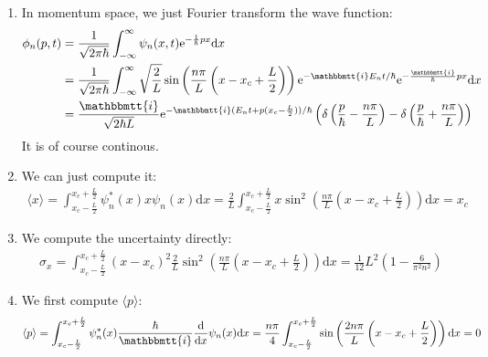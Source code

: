 \documentclass[]{ctexart}
\newcommand{\mi}{\mathbbmtt{i}}
\newcommand{\di}{\mathrm{d}}
\newcommand{\me}{\mathrm{e}}
\begin{document}
\begin{enumerate}
				\item In momentum space, we just Fourier transform the wave function:
					\begin{equation*}
						\begin{aligned}
							\phi_{n}(p, t)&=\frac{1}{\sqrt{2 \pi \hbar}} \int_{-\infty}^{\infty} \psi_{n}(x, t) \me^{-\frac{1}{\hbar} p x} \di x  \\
							&=\frac{1}{\sqrt{2 \pi \hbar}} \int_{-\infty}^{\infty} \sqrt{\frac{2}{L}}\sin\left( \frac{n\pi}{L}\left( x-x_c+\frac{L}{2}\right)\right)\me^{-\mi E_n t/\hbar} \me^{-\frac{\mi}{\hbar} p x} \di x\\
							&=\frac{\mi}{\sqrt{2 \hbar L}}\me^{-\mi (E_n t+p(x_c-\frac{L}{2}))/\hbar}  \left(\delta\left( \frac{p}{\hbar}-\frac{n\pi}{L}\right) -\delta\left( \frac{p}{\hbar}+\frac{n\pi}{L}\right) \right) 
						\end{aligned}
					\end{equation*}
				It is of course continous. 
				
				\item We can just compute it:
					\begin{equation*}
						\begin{aligned}
							\langle x\rangle=\int_{x_c-\frac{L}{2}}^{x_c+\frac{L}{2}}\psi_n^*(x)x\psi_n(x) \di x=\frac{2}{L}\int_{x_c-\frac{L}{2}}^{x_c+\frac{L}{2}}x\sin^2\left( \frac{n\pi}{L}\left( x-x_c+\frac{L}{2}\right)\right)\di x=x_c
						\end{aligned}
					\end{equation*}
				
				\item We compute the uncertainty directly:
					\begin{equation*}
						\begin{aligned}
							\sigma_x=\int_{x_c-\frac{L}{2}}^{x_c+\frac{L}{2}}(x-x_c)^2 \frac{2}{L}\sin^2\left( \frac{n\pi}{L}\left( x-x_c+\frac{L}{2}\right)\right)\di x=\frac{1}{12} L^2 \left(1-\frac{6}{\pi ^2 n^2}\right)
						\end{aligned}
					\end{equation*}
				
				\item We first compute $\langle p\rangle$:
					\begin{equation*}
						\begin{aligned}
							\langle p\rangle=\int_{x_c-\frac{L}{2}}^{x_c+\frac{L}{2}}\psi_n^*(x)\frac{\hbar}{\mi}\frac{\di }{\di x}\psi_n(x)\di x =\frac{n \pi}{4}\int_{x_c-\frac{L}{2}}^{x_c+\frac{L}{2}}\sin\left( \frac{2n\pi}{L}\left( x-x_c+\frac{L}{2}\right)\right)\di x=0
						\end{aligned}
					\end{equation*}
				

\end{enumerate}
\end{document}
